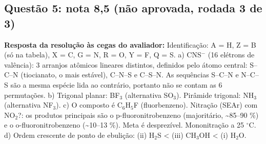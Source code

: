 \documentclass{article}%
\begin{document}
\subsection*{Questão 5: nota 8,5 (não aprovada, rodada 3 de 3)}%
\textbf{Resposta da resolução às cegas do avaliador:} Identificação: A = H, Z = B (só na tabela), X = C, G = N, R = O, Y = F, Q = S.\newline%
\newline%
a) CNS$^{-}$ (16 elétrons de valência): 3 arranjos atômicos lineares distintos, definidos pelo átomo central: S--C--N (tiocianato, o mais estável), C--N--S e C--S--N. As sequências S--C--N e N--C--S são a mesma espécie lida ao contrário, portanto não se contam as 6 permutações.\newline%
\newline%
b) Trigonal planar: BF$_{3}$ (alternativa SO$_{3}$). Pirâmide trigonal: NH$_{3}$ (alternativa NF$_{3}$).\newline%
\newline%
c) O composto é C$_{6}$H$_{5}$F (fluorbenzeno). Nitração (SEAr) com NO$_{2}$?: os produtos principais são o p{-}fluoronitrobenzeno (majoritário, \textasciitilde{}85--90 \%) e o o{-}fluoronitrobenzeno (\textasciitilde{}10--13 \%). Meta é desprezível. Mononitração a 25 $^\circ$C.\newline%
\newline%
d) Ordem crescente de ponto de ebulição: (ii) H$_{2}$S < (iii) CH$_{3}$OH < (i) H$_{2}$O.\par %
\end{document}
